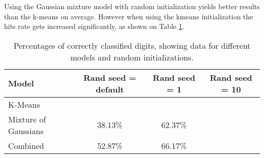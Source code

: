 \documentclass[12pt]{article}
\begin{document}
Using the Gaussian mixture model with random initialization yields better results than the k-means on average. 
However when using the kmeans initialization the hits rate gets increased significantly, as shown on 
Table \ref{tab:results}.

\begin{table}[h]
\caption[Table caption text]{Percentages of correctly classified digits, showing data for different models and random initializations.}
\label{tab:results}
\begin{tabular}{|l|c|c|c|}
\hline
Model                 & Rand seed = default & Rand seed = 1 & Rand seed = 10 \\ \hline
K-Means               &                     &               &                \\ \hline
Mixture of  Gaussians & 38.13\%             &   	62.37\%    &                \\ \hline
Combined              & 52.87\%             &    66.17\%    &                \\ \hline
\end{tabular}
\end{table}
 
\end{document}
